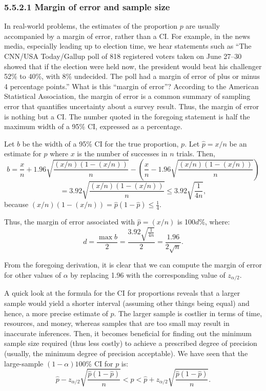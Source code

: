 \subsubsection*{5.5.2.1 Margin of error and sample size}

In real-world problems, the estimates of the proportion $p$ are usually accompanied by a margin of error, rather than a CI. For example, in the news media, especially leading up to election time, we hear statements such as ``The CNN/USA Today/Gallup poll of 818 registered voters taken on June 27--30 showed that if the election were held now, the president would beat his challenger 52\% to 40\%, with 8\% undecided. The poll had a margin of error of plus or minus 4 percentage points.'' What is this ``margin of error''? According to the American Statistical Association, the margin of error is a common summary of sampling error that quantifies uncertainty about a survey result. Thus, the margin of error is nothing but a CI. The number quoted in the foregoing statement is half the maximum width of a 95\% CI, expressed as a percentage.

Let $b$ be the width of a 95\% CI for the true proportion, $p$. Let $\hat{p} = x/n$ be an estimate for $p$ where $x$ is the number of successes in $n$ trials. Then,
\[
b = \frac{x}{n} + 1.96\sqrt{\frac{(x/n)(1-(x/n))}{n}} - \left(\frac{x}{n} - 1.96\sqrt{\frac{(x/n)(1-(x/n))}{n}}\right)
\]
\[
= 3.92\sqrt{\frac{(x/n)(1-(x/n))}{n}} \leq 3.92\sqrt{\frac{1}{4n}},
\]
because $(x/n)(1-(x/n)) = \hat{p}(1-\hat{p}) \leq \frac{1}{4}$.

Thus, the margin of error associated with $\hat{p} = (x/n)$ is 100$d$\%, where:
\[
d = \frac{\max b}{2} = \frac{3.92\sqrt{\frac{1}{4n}}}{2} = \frac{1.96}{2\sqrt{n}}.
\]

From the foregoing derivation, it is clear that we can compute the margin of error for other values of $\alpha$ by replacing 1.96 with the corresponding value of $z_{\alpha/2}$.

A quick look at the formula for the CI for proportions reveals that a larger sample would yield a shorter interval (assuming other things being equal) and hence, a more precise estimate of $p$. The larger sample is costlier in terms of time, resources, and money, whereas samples that are too small may result in inaccurate inferences. Then, it becomes beneficial for finding out the minimum sample size required (thus less costly) to achieve a prescribed degree of precision (usually, the minimum degree of precision acceptable). We have seen that the large-sample $(1-\alpha)100\%$ CI for $p$ is:
\[
\hat{p} - z_{\alpha/2}\sqrt{\frac{\hat{p}(1-\hat{p})}{n}} < p < \hat{p} + z_{\alpha/2}\sqrt{\frac{\hat{p}(1-\hat{p})}{n}}.
\]

